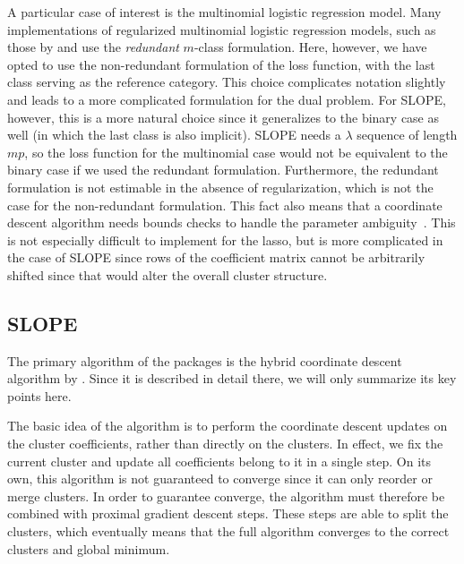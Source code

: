\documentclass[article]{jss}
\begin{document}
A particular case of interest is the multinomial logistic regression model.
Many implementations of regularized multinomial logistic regression models, such
as those by \citet{friedman2010} and \citet{fercoq2015} use the \emph{redundant}
\(m\)-class formulation. Here, however, we have opted to use the non-redundant
formulation of the loss function, with the last class serving as the reference
category. This choice complicates notation slightly and leads to a more
complicated formulation for the dual problem. For SLOPE, however, this is a
more natural choice since it generalizes to the binary case as well (in which
the last class is also implicit). SLOPE needs a \(\lambda\) sequence of length
\(mp\), so the loss function for the multinomial case would not be equivalent
to the binary case if we used the redundant formulation. Furthermore, the
redundant formulation is not estimable in the absence of regularization, which
is not the case for the non-redundant formulation. This fact also means that a
coordinate descent algorithm needs bounds checks to handle the parameter
ambiguity~\citep{friedman2010}. This is not especially difficult to implement
for the lasso, but is more complicated in the case of SLOPE since rows of the
coefficient matrix cannot be arbitrarily shifted since that would alter the
overall cluster structure.

\subsection{SLOPE}

The primary algorithm of the  packages is the hybrid
coordinate descent algorithm by \citet{larsson2023}. Since it is described in
detail there, we will only summarize its key points here.

The basic idea of the algorithm is to perform the coordinate descent updates on
the cluster coefficients, rather than directly on the clusters. In effect, we fix the
current cluster and update all coefficients belong to it in a single step.
On its own, this algorithm is not guaranteed to converge since it can only
reorder or merge clusters. In order to guarantee converge, the algorithm must
therefore be combined with proximal gradient descent steps. These steps
are able to split the clusters, which eventually means that the full
algorithm converges to the correct clusters and global minimum.
\end{document}
